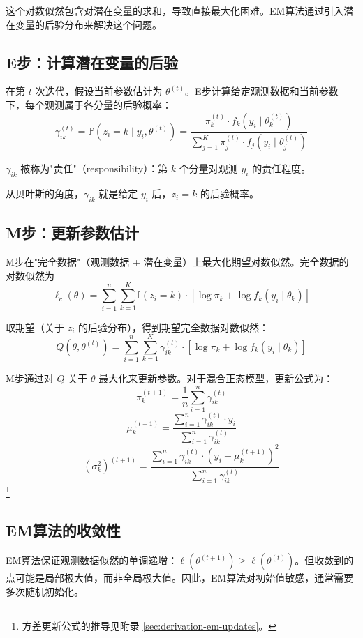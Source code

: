 这个对数似然包含对潜在变量的求和，导致直接最大化困难。EM算法通过引入潜在变量的后验分布来解决这个问题。

\subsection{E步：计算潜在变量的后验}

在第 $t$ 次迭代，假设当前参数估计为 $\theta^{(t)}$。E步计算给定观测数据和当前参数下，每个观测属于各分量的后验概率：
\[
\gamma_{ik}^{(t)} = \mathbb{P}(z_i = k \mid y_i, \theta^{(t)}) = \frac{\pi_k^{(t)} \cdot f_k(y_i \mid \theta_k^{(t)})}{\sum_{j=1}^{K} \pi_j^{(t)} \cdot f_j(y_i \mid \theta_j^{(t)})}
\label{eq:mixture-responsibility}
\]

$\gamma_{ik}$ 被称为"责任"（responsibility）：第 $k$ 个分量对观测 $y_i$ 的责任程度。

从贝叶斯的角度，$\gamma_{ik}$ 就是给定 $y_i$ 后，$z_i = k$ 的后验概率。

\subsection{M步：更新参数估计}

M步在"完全数据"（观测数据 + 潜在变量）上最大化期望对数似然。完全数据的对数似然为
\[
\ell_c(\theta) = \sum_{i=1}^{n} \sum_{k=1}^{K} \mathbb{I}(z_i = k) \cdot \left[ \log \pi_k + \log f_k(y_i \mid \theta_k) \right]
\]

取期望（关于 $z_i$ 的后验分布），得到期望完全数据对数似然：
\[
Q(\theta, \theta^{(t)}) = \sum_{i=1}^{n} \sum_{k=1}^{K} \gamma_{ik}^{(t)} \cdot \left[ \log \pi_k + \log f_k(y_i \mid \theta_k) \right]
\]

M步通过对 $Q$ 关于 $\theta$ 最大化来更新参数。对于混合正态模型，更新公式为：
\[
\pi_k^{(t+1)} = \frac{1}{n} \sum_{i=1}^{n} \gamma_{ik}^{(t)}
\]
\[
\mu_k^{(t+1)} = \frac{\sum_{i=1}^{n} \gamma_{ik}^{(t)} \cdot y_i}{\sum_{i=1}^{n} \gamma_{ik}^{(t)}}
\]
\[
(\sigma_k^2)^{(t+1)} = \frac{\sum_{i=1}^{n} \gamma_{ik}^{(t)} \cdot (y_i - \mu_k^{(t+1)})^2}{\sum_{i=1}^{n} \gamma_{ik}^{(t)}}
\tag{eq:mixture-variance-update}
\]\footnote{方差更新公式的推导见附录 \cref{sec:derivation-em-updates}。}

\subsection{EM算法的收敛性}

EM算法保证观测数据似然的单调递增：$\ell(\theta^{(t+1)}) \geq \ell(\theta^{(t)})$。但收敛到的点可能是局部极大值，而非全局极大值。因此，EM算法对初始值敏感，通常需要多次随机初始化。

